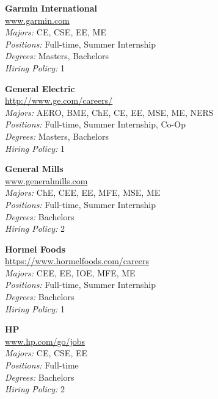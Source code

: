 \documentclass[twoside]{article}
\begin{document}
\begin{center}
\begin{multicols}{3}
\begin{minipage}{.9\columnwidth}{\Large\bf Garmin International }\\
	\url{www.garmin.com}\\
	\emph{Majors:} CE, CSE, EE, ME\\
	\emph{Positions:} Full-time, Summer Internship\\
	\emph{Degrees:} Masters, Bachelors\\
	\emph{Hiring Policy:} 1\\
\end{minipage}
 
\begin{minipage}{.9\columnwidth}{\Large\bf General Electric }\\
	\url{http://www.ge.com/careers/}\\
	\emph{Majors:} AERO, BME, ChE, CE, EE, MSE, ME, NERS\\
	\emph{Positions:} Full-time, Summer Internship, Co-Op\\
	\emph{Degrees:} Masters, Bachelors\\
	\emph{Hiring Policy:} 1\\
\end{minipage}
 
\begin{minipage}{.9\columnwidth}{\Large\bf General Mills }\\
	\url{www.generalmills.com}\\
	\emph{Majors:} ChE, CEE, EE, MFE, MSE, ME\\
	\emph{Positions:} Full-time, Summer Internship\\
	\emph{Degrees:} Bachelors\\
	\emph{Hiring Policy:} 2\\
\end{minipage}
 
\begin{minipage}{.9\columnwidth}{\Large\bf Hormel Foods }\\
	\url{https://www.hormelfoods.com/careers}\\
	\emph{Majors:} CEE, EE, IOE, MFE, ME\\
	\emph{Positions:} Full-time, Summer Internship\\
	\emph{Degrees:} Bachelors\\
	\emph{Hiring Policy:} 1\\
\end{minipage}
 
\begin{minipage}{.9\columnwidth}{\Large\bf HP }\\
	\url{www.hp.com/go/jobs}\\
	\emph{Majors:} CE, CSE, EE\\
	\emph{Positions:} Full-time\\
	\emph{Degrees:} Bachelors\\
	\emph{Hiring Policy:} 2\\
\end{minipage}
 

\end{multicols}
\end{center}
\end{document}
